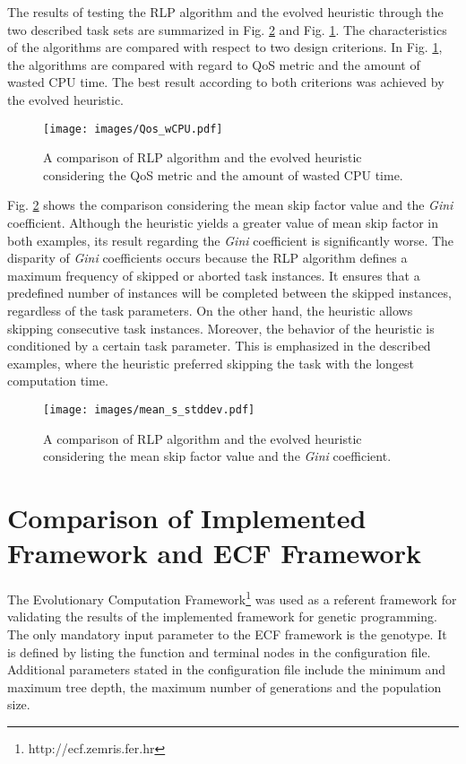 The results of testing the RLP algorithm and the evolved heuristic through the two described task sets are summarized in Fig. \ref{cmp2} and Fig. \ref{cmp1}.
The characteristics of the algorithms are compared with respect to two design criterions. 
In Fig. \ref{cmp1}, the algorithms are compared with regard to QoS metric and the amount of wasted CPU time. The best result according to both criterions was achieved by the evolved heuristic. 
\begin{figure}[H]
    \centering
    \texttt{[image: images/Qos\_wCPU.pdf]}
    \caption{A comparison of RLP algorithm and the evolved heuristic considering the QoS metric and the amount of wasted CPU time.}
    \label{cmp1}
\end{figure}

Fig. \ref{cmp2} shows the comparison considering the mean skip factor value and the \textit{Gini} coefficient. 
Although the heuristic yields a greater value of mean skip factor in both examples, its result regarding the \textit{Gini} coefficient is significantly worse.
The disparity of \textit{Gini} coefficients occurs because the RLP algorithm defines a maximum frequency of skipped or aborted task instances.
It ensures that a predefined number of instances will be completed between the skipped instances, regardless of the task parameters.
On the other hand, the heuristic allows skipping consecutive task instances.
Moreover, the behavior of the heuristic is conditioned by a certain task parameter.
This is emphasized in the described examples, where the heuristic preferred skipping the task with the longest computation time.
\begin{figure}[H]
    \centering
    \texttt{[image: images/mean\_s\_stddev.pdf]}
    \caption{A comparison of RLP algorithm and the evolved heuristic considering the mean skip factor value and the \textit{Gini} coefficient.}
    \label{cmp2}
\end{figure}

\section{Comparison of Implemented Framework and ECF Framework}
The Evolutionary Computation Framework\footnote{http://ecf.zemris.fer.hr} was used as a referent framework for validating the results of the implemented framework for genetic programming.
The only mandatory input parameter to the ECF framework is the genotype.
It is defined by listing the function and terminal nodes in the configuration file.
Additional parameters stated in the configuration file include the minimum and maximum tree depth, the maximum number of generations and the population size.

